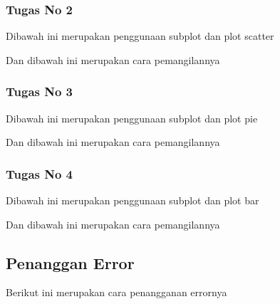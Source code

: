 \subsubsection{Tugas No 2}

\hfill \break

Dibawah ini merupakan penggunaan subplot dan plot scatter

Dan dibawah ini merupakan cara pemangilannya



\subsubsection{Tugas No 3}

\hfill \break

Dibawah ini merupakan penggunaan subplot dan plot pie

Dan dibawah ini merupakan cara pemangilannya



\subsubsection{Tugas No 4}

\hfill \break

Dibawah ini merupakan penggunaan subplot dan plot bar

Dan dibawah ini merupakan cara pemangilannya



\subsection{Penanggan Error}

\hfill \break

Berikut ini merupakan cara penangganan errornya
